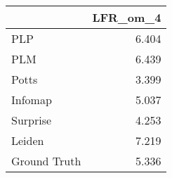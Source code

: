 \begin{tabular}{lr}
\toprule
{} & LFR_om_4 \\
\midrule
PLP          &    6.404 \\
PLM          &    6.439 \\
Potts        &    3.399 \\
Infomap      &    5.037 \\
Surprise     &    4.253 \\
Leiden       &    7.219 \\
Ground Truth &    5.336 \\
\bottomrule
\end{tabular}
